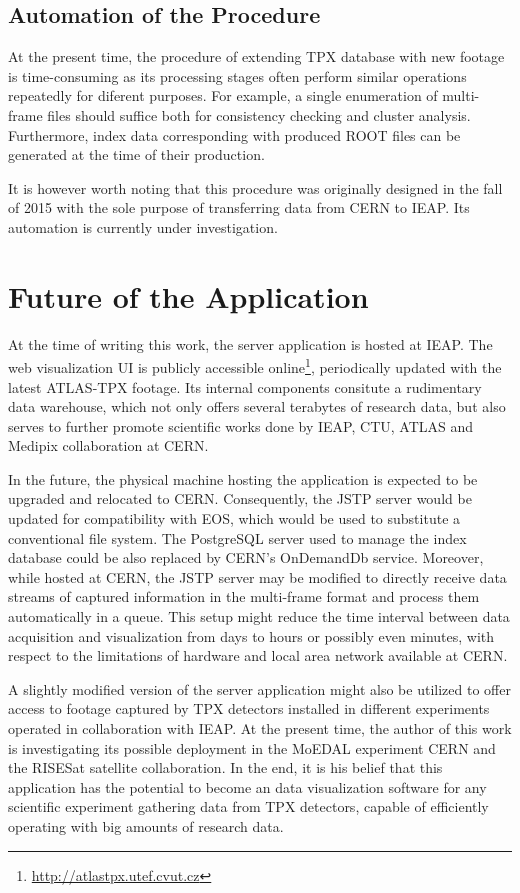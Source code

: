 \subsection{Automation of the Procedure}
At the present time, the procedure of extending TPX database with new footage is time-consuming as its processing stages often perform similar operations repeatedly for diferent purposes. For example, a single enumeration of multi-frame files should suffice both for consistency checking and cluster analysis. Furthermore, index data corresponding with produced ROOT files can be generated at the time of their production.

It is however worth noting that this procedure was originally designed in the fall of 2015 with the sole purpose of transferring data from CERN to IEAP. Its automation is currently under investigation.

\section{Future of the Application}
At the time of writing this work, the server application is hosted at IEAP. The web visualization UI is publicly accessible online\footnote{\url{http://atlastpx.utef.cvut.cz}}, periodically updated with the latest ATLAS-TPX footage. Its internal components consitute a rudimentary data warehouse, which not only offers several terabytes of research data, but also serves to further promote scientific works done by IEAP, CTU, ATLAS and Medipix collaboration at CERN.

In the future, the physical machine hosting the application is expected to be upgraded and relocated to CERN. Consequently, the JSTP server would be updated for compatibility with EOS, which would be used to substitute a conventional file system. The PostgreSQL server used to manage the index database could be also replaced by CERN's OnDemandDb service. Moreover, while hosted at CERN, the JSTP server may be modified to directly receive data streams of captured information in the multi-frame format and process them automatically in a queue. This setup might reduce the time interval between data acquisition and visualization from days to hours or possibly even minutes, with respect to the limitations of hardware and local area network available at CERN.

A slightly modified version of the server application might also be utilized to offer access to footage captured by TPX detectors installed in different experiments operated in collaboration with IEAP. At the present time, the author of this work is investigating its possible deployment in the MoEDAL experiment CERN and the RISESat satellite collaboration. In the end, it is his belief that this application has the potential to become an data visualization software for any scientific experiment gathering data from TPX detectors, capable of efficiently operating with big amounts of research data.
